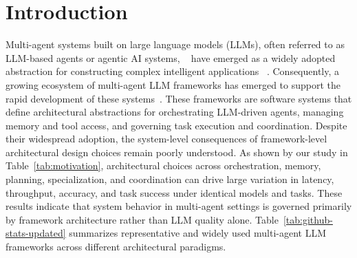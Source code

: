 

\section{Introduction}
\vspace{-1mm}









Multi-agent systems built on large language models (LLMs), often referred to as LLM-based agents or agentic AI systems,
~\cite{NEURIPS2024_fa54b0ed,
proagentcooperativeagent,
githubissuemultiagentllm,
qian-etal-2024-chatdev,
jin-etal-2024-agentreview}
have emerged as a widely adopted abstraction for constructing complex intelligent applications
~\cite{omar2025chatty, he2025llm,
githubissuemultiagentllm,
qian-etal-2024-chatdev}. Consequently, a growing ecosystem of multi-agent LLM frameworks has emerged to support the rapid development of these systems~\cite{langgraph2025, crewai2025, wu2024autogen, openaiagents2025, vezhnevets2023generative, touzel2024simulation}. These frameworks are software systems that define architectural abstractions for orchestrating LLM-driven agents, managing memory and tool access, and governing task execution and coordination. Despite their widespread adoption, the system-level consequences of framework-level architectural design choices remain poorly understood. As shown by our study in Table~\ref{tab:motivation}, architectural choices across orchestration, memory, planning, specialization, and coordination can drive large variation in latency, throughput, accuracy, and task success under identical models and tasks. These results indicate that system behavior in multi-agent settings is governed primarily by framework architecture rather than LLM quality alone. Table~\ref{tab:github-stats-updated} summarizes representative and widely used multi-agent LLM frameworks across different architectural paradigms.


